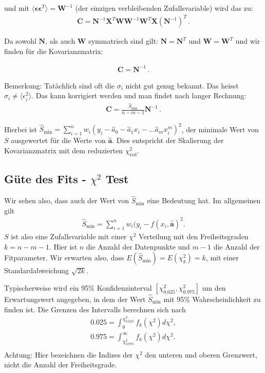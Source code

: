 und mit $\langle \boldsymbol{ \epsilon \epsilon}^T \rangle  = \boldsymbol{W}^{-1} $ (der einzigen verbleibenden Zufallsvariable) wird das zu:
\begin{align}
\boldsymbol{C} = \boldsymbol{N}^{-1} \boldsymbol{X}^T \boldsymbol{W}  \boldsymbol{W}^{-1}  \boldsymbol{W}^T \boldsymbol{X} \left( \boldsymbol{N}^{-1}\right)^T\,.
\end{align}

Da sowohl $\boldsymbol{N}$, als auch $\boldsymbol{W}$ symmatrisch sind gilt: $\boldsymbol{N} = \boldsymbol{N}^T$ und $\boldsymbol{W} = \boldsymbol{W}^T$ und wir finden für die Kovarianzmatrix:

\begin{align}
\boldsymbol{C} = \boldsymbol{N}^{-1}\,.
\label{eq:vl8-43}
\end{align}

Bemerkung: Tat\"achlich sind oft die $\sigma_i$ nicht gut genug bekannt. Das heisst $\sigma_i \neq \langle \epsilon_i^2 \rangle$. Das kann korrigiert werden und man findet nach langer Rechnung:
\begin{align}
\boldsymbol{C} = \frac{ \hat{S}_\text{min} }{ n - m -1 } \boldsymbol{N}^{-1}\,.
\label{eq:vl8-44}
\end{align}

Hierbei ist $\hat{S}_\text{min} = \sum_{i=1}^n w_i ( y_i - \hat{a}_0 - \hat{a}_1 x_i - ... \hat{a}_m x_i^m)^2$, der minimale Wert von $S$ ausgewertet f\"ur die Werte von $\boldsymbol{\hat{a}}$. Dies entspricht der Skalierung der Kovarianzmatrix mit dem reduzierten $\chi^2_\mathrm{red}$. 

\subsection{Güte des Fits - $\chi^2$ Test}
\label{subsec:vl8-5-1}

Wir sehen also, dass auch der Wert von $\hat{S}_\text{min}$ eine Bedeutung hat. Im allgemeinen gilt
\begin{align}
\hat{S}_\text{min} = \sum_{i=1}^n w_i ( y_i - f(x_i, \boldsymbol{\hat{a}})^2.
\end{align}
$S$ ist also eine Zufallsvariable mit einer $\chi^2$ Verteilung mit den Freiheitsgraden $k = n-m-1$. Hier ist $n$ die Anzahl der Datenpunkte und $m-1$ die Anzahl der Fitparameter. Wir erwarten also, dass $E(\hat{S}_\text{min}) = E(\chi^2_k) = k$, mit einer Standardabweichung $\sqrt{2k}$.

Typischerweise wird ein 95\% Konfidenzinterval $\left[\chi^2_{0.025}, \chi^2_{0.975} \right]$ um den Erwartungswert angegeben, in dem der Wert $\hat{S}_\text{min}$ mit 95\% Wahrscheinlichkeit zu finden ist.
Die Grenzen des Intervalls berechnen sich nach
\begin{align}
0.025 = \int_0^{\chi^2_{0.025}} f_k(\chi^2)d\chi^2,\\
0.975 = \int_{\chi^2_{0.975}}^\infty f_k(\chi^2)d\chi^2.\\
\end{align}
Achtung: Hier bezeichnen die Indizes der $\chi^2$ den unteren und oberen Grenzwert, nicht die Anzahl der Freiheitsgrade.

